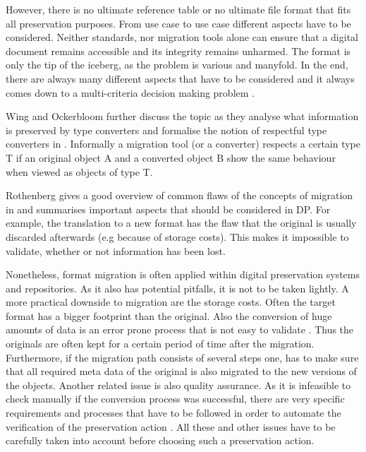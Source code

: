However, there is no ultimate reference table or no ultimate file format that fits all preservation purposes. From use case to use case different aspects have to be considered. Neither standards, nor migration tools alone can ensure that a digital document remains accessible and its integrity remains unharmed. The format is only the tip of the iceberg, as the problem is various and manyfold. In the end, there are always many different aspects that have to be considered and it always comes down to a multi-criteria decision making problem \cite{becker:decision}.

Wing and Ockerbloom further discuss the topic as they analyse what information is preserved by type converters and formalise the notion of respectful type converters in \cite{859529}. Informally a migration tool (or a converter) respects a certain type T if an original object A and a converted object B show the same behaviour when viewed as objects of type T.

Rothenberg gives a good overview of common flaws of the concepts of migration in \cite{rothenberg:1999:ensuring} and summarises important aspects that should be considered in DP. For example, the translation to a new format has the flaw that the original is usually discarded afterwards (e.g because of storage costs). This makes it impossible to validate, whether or not information has been lost.

Nonetheless, format migration is often applied within digital preservation systems and repositories. As it also has potential pitfalls, it is not to be taken lightly.
A more practical downside to migration are the storage costs. Often the target format has a bigger footprint than the original. Also the conversion of huge amounts of data is an error prone process that is not easy to validate \cite{Lorie:2001:LTP:379437.379726}. Thus the originals are often kept for a certain period of time after the migration. Furthermore, if the migration path consists of several steps one, has to make sure that all required meta data of the original is also migrated to the new versions of the objects. Another related issue is also quality assurance. As it is infeasible to check manually if the conversion process was successful, there are very specific requirements and processes that have to be followed in order to automate the verification of the preservation action \cite{feng:2010:qrofm, becker:decision}.
All these and other issues have to be carefully taken into account before choosing such a preservation action.
\newline

